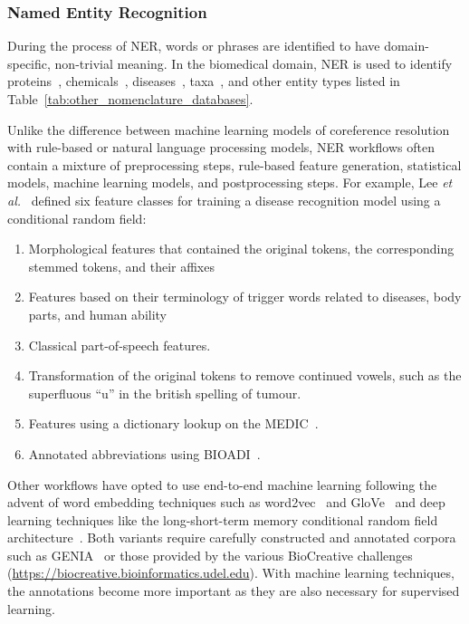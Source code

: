 \subsubsection*{Named Entity Recognition}

During the process of \ac{NER}, words or phrases are identified to have domain-specific, non-trivial meaning.
In the biomedical domain, \ac{NER} is used to identify proteins~\cite{Hsu2008,Leaman2008, Hakenberg2011,Wei2015}, chemicals~\cite{Leaman2015,Corbett2018,Giorgi526244}, diseases~\cite{Leaman2013,Giorgi526244}, taxa~\cite{Gerner2010,Wei2012}, and other entity types listed in Table~\ref{tab:other_nomenclature_databases}.

Unlike the difference between machine learning models of coreference resolution with rule-based or natural language processing models, \ac{NER} workflows often contain a mixture of preprocessing steps, rule-based feature generation, statistical models, machine learning models, and postprocessing steps.
For example, Lee \textit{et al.}~\cite{Lee2015} defined six feature classes for training a disease recognition model using a conditional random field:
\begin{enumerate}[noitemsep]
    \item Morphological features that contained the original tokens, the corresponding stemmed tokens, and their affixes
    \item Features based on their terminology of trigger words related to diseases, body parts, and human ability
    \item Classical part-of-speech features.
    \item Transformation of the original tokens to remove continued vowels, such as the superfluous ``u'' in the british spelling of tumour.
    \item Features using a dictionary lookup on the \ac{MEDIC}~\cite{Davis2012}.
    \item Annotated abbreviations using BIOADI~\cite{Kuo2009}.
\end{enumerate}

Other workflows have opted to use end-to-end machine learning following the advent of word embedding techniques such as word2vec~\cite{Mikolov2013} and GloVe~\cite{Pennington2014} and deep learning techniques like the long-short-term memory conditional random field architecture~\cite{Lample2016}.
Both variants require carefully constructed and annotated corpora such as GENIA~\cite{Kim2003} or those provided by the various BioCreative challenges (\url{https://biocreative.bioinformatics.udel.edu}).
With machine learning techniques, the annotations become more important as they are also necessary for supervised learning.

